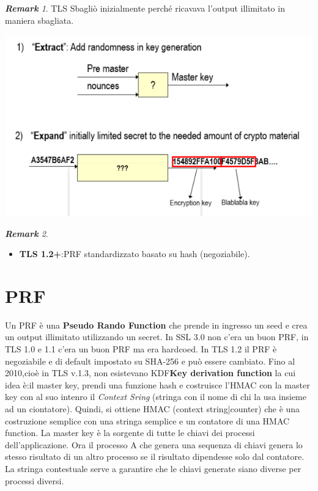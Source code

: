 \documentclass{book}
\theoremstyle{remark}
\newtheorem*{remark}{\textbf{Remark}}
\begin{document}
\begin{remark}
	TLS Sbagliò inizialmente perché ricavava l'output illimitato in maniera sbagliata\@.
\end{remark}
\begin{center}
	\includegraphics[scale=0.6]{2021-12-08-18-25-04.png}
\end{center}
\begin{remark}
	\begin{itemize}
		\item \textbf{TLS 1\@.2+}:\@usa PRF standardizzato basato su hash (negoziabile)\@.
	\end{itemize}
\end{remark}
\section{PRF}
Un PRF è una \textbf{Pseudo Rando Function} che prende in ingresso un seed e crea un output illimitato utilizzando un secret\@. In SSL 3\@.0 non c'era un buon PRF, in TLS 1\@.0 e 1\@.1 c'era un buon PRF ma era hardcoed\@. In TLS 1\@.2 il PRF è negoziabile e di default impostato su SHA-256 e può essere cambiato\@.\newline
Fino al 2010,cioè in TLS v\@.1\@.3, non esistevano KDF\textbf{Key derivation function} la cui idea è:\@prendi il master key, prendi una funzione hash e costruisce l'HMAC con la master key con al suo intenro il \emph{Context Sring} (stringa con il nome di chi la usa insieme ad un ciontatore)\@.\newline
Quindi, si ottiene HMAC (context string|counter) che è una costruzione semplice con una stringa semplice e un contatore di una HMAC function\@. La master key è la sorgente di tutte le chiavi dei processi dell'applicazione\@. Ora il processo A che genera una sequenza di chiavi genera lo stesso risultato di un altro processo se il risultato dipendesse solo dal contatore\@. La stringa contestuale serve a garantire che le chiavi generate siano diverse per processi diversi\@.
\end{document}
